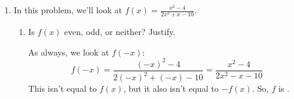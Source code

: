 \documentclass{article}
\renewcommand{\answer}[1]{#1}
\theoremstyle{theorem}
\begin{document}
\begin{enumerate}
\begin{enumerate}
  \item
    \begin{problem}[\vfill]
      Since $E(t)$ is exponential, we can write $E(t) = C e^{kt}$. What are $C$ and $k$? 
    \end{problem}

    \begin{solution}
      Since $E(0) = 150$, we have $C e^0 = 150$, or .

      We also have $E'(0) = 2$. Since $E(t) = 150 e^{kt}$, we have
      \begin{align*}
        E'(t) &= 150 k e^{kt} \\
        E'(0) &= 150 k
      \end{align*}
      In order for this to equal $2$, we must have $\boxed{k = \dfrac{1}{75}}$. 
    \end{solution}

  \item
    \begin{problem}[\vfill\newpage]
      Which model predicts a higher amount of waste in the country's landfills one month from now? Explain briefly.
    \end{problem}

    \begin{solution}
      From the graphs we sketched, we can see that \answer{$E(t)$} always predicts a higher amount of waste than $L(t)$ (except at $t = 0$, where they're equal). 
    \end{solution}

  \end{enumerate}

\item {}  

  In this problem, we'll look at $\displaystyle f(x) = \frac{x^2 - 4}{2x^2 + x - 10}$.

  \begin{enumerate}

  \item 
    \begin{problem}[\stretch{0.5}]
      Is $f(x)$ even, odd, or neither? Justify.
    \end{problem}

    \begin{solution}
      As always, we look at $f(-x)$:
      \[ f(-x) = \frac{(-x)^2 - 4}{2 (-x)^2 + (-x) - 10} = \frac{x^2 - 4}{2x^2 - x - 10}\]
      This isn't equal to $f(x)$, but it also isn't equal to $-f(x)$. So, $f$ is .
    \end{solution}


\end{enumerate}
\end{enumerate}
\end{document}
